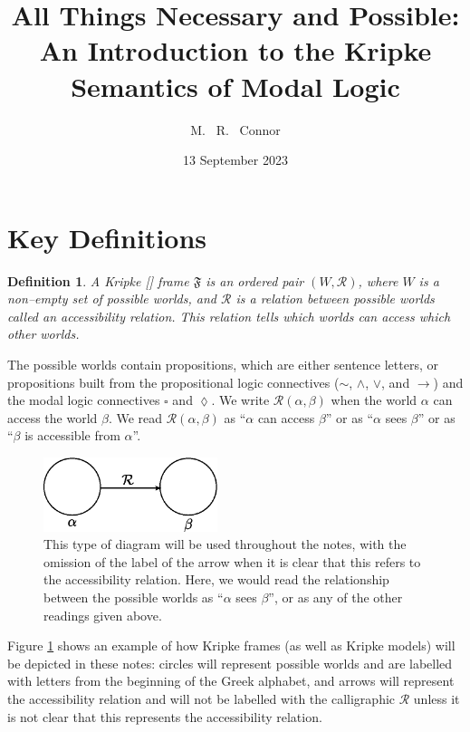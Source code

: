 \documentclass[12pt]{article}
\newtheorem{definition}{Definition}[section]
\begin{document}
\title{All Things Necessary and Possible: An Introduction to the Kripke Semantics of Modal Logic}
\author{M.~ R.~ Connor}
\date{13 September 2023}

\maketitle
\section{Key Definitions}

\begin{definition}
    A Kripke [] frame $\mathfrak{F}$ is an ordered pair $(W, \mathcal{R})$, where $W$ is a non--empty set of possible worlds, and $\mathcal{R}$ is a relation
    between possible worlds called an \emph{accessibility relation}. This relation tells which worlds can access which other worlds.
\end{definition}

The possible worlds contain propositions, which are either sentence letters, or propositions built from the propositional logic connectives ($\sim$, $\wedge$, $\vee$, and $\rightarrow$) and 
the modal logic connectives $\square$ and $\lozenge$. We write $\mathcal{R}(\alpha, \beta)$ when the world $\alpha$ can access the world $\beta$. We read $\mathcal{R}(\alpha, \beta)$ as
``$\alpha$ can access $\beta$'' or as ``$\alpha$ sees $\beta$'' or as ``$\beta$ is accessible from $\alpha$''.

\begin{figure}[h]
    \centering
    \includegraphics[width=2in]{Rab.eps}
    \caption{This type of diagram will be used throughout the notes, with the omission of the label of the arrow when it is clear that this refers to the accessibility relation. Here, we would
    read the relationship between the possible worlds as ``$\alpha$ sees $\beta$'', or as any of the other readings given above.}
    \label{Sample Kripke Frame}
\end{figure}

Figure \ref{Sample Kripke Frame} shows an example of how Kripke frames (as well as Kripke models) will be depicted in these notes: circles
will represent possible worlds and are labelled with letters from the beginning of the Greek alphabet, and arrows will represent the accessibility relation
and will not be labelled with the calligraphic $\mathcal{R}$ unless it is not clear that this represents the accessibility relation.
\end{document}
